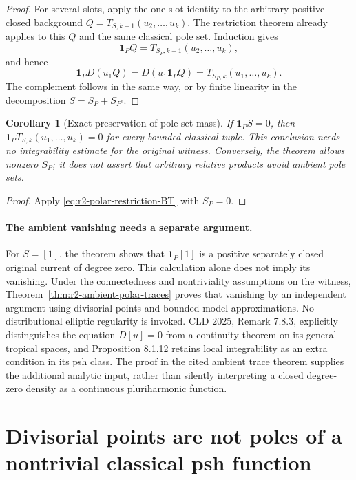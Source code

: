 \documentclass[11pt,a4paper]{article}
\numberwithin{equation}{section}
\newtheorem{corollary}[theorem]{Corollary}
\theoremstyle{definition}
\theoremstyle{remark}
\begin{document}
\begin{proof}
For several slots, apply the one-slot identity to the arbitrary
positive closed background
$Q=T_{S,k-1}(u_2,\ldots,u_k)$. The restriction theorem already
applies to this $Q$ and the same classical pole set. Induction
gives
\[
 \mathbf1_PQ=T_{S_P,k-1}(u_2,\ldots,u_k),
\]
and hence
\[
 \mathbf1_PD(u_1Q)=D(u_1\mathbf1_PQ)
                         =T_{S_P,k}(u_1,\ldots,u_k).
\]
The complement follows in the same way, or by finite linearity
in the decomposition $S=S_P+S_{P^c}$.
\end{proof}

\begin{corollary}[Exact preservation of pole-set mass]
\label{cor:r2-pole-mass-preservation}
If $\mathbf1_PS=0$, then
$\mathbf1_PT_{S,k}(u_1,\ldots,u_k)=0$ for every bounded
classical tuple. This conclusion needs no integrability estimate
for the original witness. Conversely, the theorem allows nonzero
$S_P$; it does not assert that arbitrary relative products avoid
ambient pole sets.
\end{corollary}

\begin{proof}
Apply \eqref{eq:r2-polar-restriction-BT} with $S_P=0$.
\end{proof}

\paragraph{The ambient vanishing needs a separate argument.}
For $S=[1]$, the theorem shows that $\mathbf1_P[1]$ is a
positive separately closed original current of degree zero.
This calculation alone does not imply its vanishing. Under the
connectedness and nontriviality assumptions on the witness,
Theorem~\ref{thm:r2-ambient-polar-traces} proves that vanishing
by an independent argument using divisorial points and bounded
model approximations. No distributional elliptic regularity is invoked.
CLD 2025, Remark 7.8.3, explicitly distinguishes the equation
$D[u]=0$ from a continuity theorem on its general tropical
spaces, and Proposition 8.1.12 retains local integrability as
an extra condition in its psh class. The proof in the cited
ambient trace theorem supplies the additional analytic input,
rather than silently interpreting a closed degree-zero density
as a continuous pluriharmonic function.



\section{Divisorial points are not poles of a nontrivial classical psh function}
\label{sec:r2-divisorial-poles}
\end{document}
